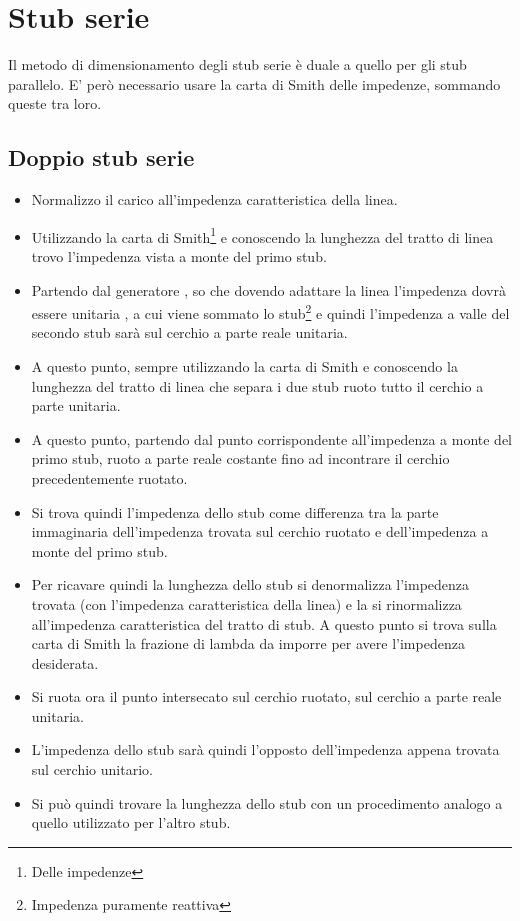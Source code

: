 	
	\section{Stub serie}

	 	Il metodo di dimensionamento degli stub serie è duale a quello per gli stub parallelo. E' però necessario usare la carta di Smith delle impedenze, sommando queste tra loro.

		\subsection{Doppio stub serie}

			\begin{itemize}

			\item Normalizzo il carico all'impedenza caratteristica della linea.
			\item Utilizzando la carta di Smith\footnote{Delle impedenze} e conoscendo la lunghezza del tratto di linea trovo l'impedenza vista a monte del primo stub.  
			\item Partendo dal generatore , so che dovendo adattare la linea l'impedenza dovrà essere unitaria , a cui viene sommato lo stub\footnote{Impedenza puramente reattiva} e quindi l'impedenza a valle del secondo stub sarà sul cerchio a parte reale unitaria.  
			\item A questo punto, sempre utilizzando la carta di Smith e conoscendo la lunghezza del tratto di linea che separa i due stub ruoto tutto il cerchio a parte unitaria.
			\item A questo punto, partendo dal punto corrispondente all'impedenza a monte del primo stub, ruoto a parte reale costante fino ad incontrare il cerchio precedentemente ruotato.
			\item Si trova quindi l'impedenza dello stub come differenza tra la parte immaginaria dell'impedenza trovata sul cerchio ruotato e dell'impedenza a monte del primo stub. 
			\item Per ricavare quindi la lunghezza dello stub si denormalizza l'impedenza trovata (con l'impedenza caratteristica della linea) e la si rinormalizza all'impedenza caratteristica del tratto di stub. A questo punto si trova sulla carta di Smith la frazione di lambda da imporre per avere l'impedenza desiderata.  
			\item Si ruota ora il punto intersecato sul cerchio ruotato, sul cerchio a parte reale unitaria.
			\item L'impedenza dello stub sarà quindi l'opposto dell'impedenza appena trovata sul cerchio unitario.
			\item Si può quindi trovare la lunghezza dello stub con un procedimento analogo a quello utilizzato per l'altro stub.
			
			\end{itemize}

